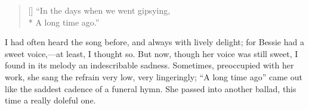 \begin{verse}[\versewidth]
\enquote{In the days when we went gipsying,\\*
\hspace*{0.333em}\hspace*{0.333em} A long time ago.}
\end{verse}

I had often heard the song before, and always with lively delight; for
Bessie had a sweet voice,---at least, I thought so.  But now, though her
voice was still sweet, I found in its melody an indescribable sadness. 
Sometimes, preoccupied with her work, she sang the refrain very low,
very lingeringly; \enquote{A long time ago} came out like the saddest
cadence of a funeral hymn.  She passed into another ballad, this time a
really doleful one.

